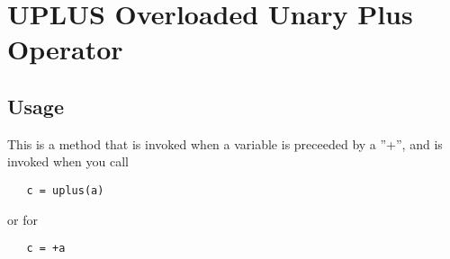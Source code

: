 \section{UPLUS Overloaded Unary Plus Operator}

\subsection{Usage}

This is a method that is invoked when a variable is preceeded by a ''+'',
and is invoked when you call
\begin{verbatim}
   c = uplus(a)
\end{verbatim}
or for 
\begin{verbatim}
   c = +a
\end{verbatim}
